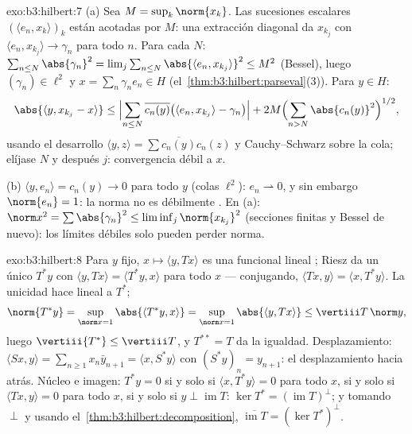 \begin{solution}{exo:b3:hilbert:7}
(a) Sea $M = \sup_k\norm{x_k}$. Las sucesiones escalares
$(\langle e_n, x_k\rangle)_k$ están acotadas por $M$: una extracción
diagonal da $x_{k_j}$ con $\langle e_n, x_{k_j}\rangle
\to \gamma_n$ para todo $n$. Para cada $N$: $\sum_{n\leq
N}\abs{\gamma_n}^2 = \lim_j\sum_{n\leq N}\abs{\langle e_n,
x_{k_j}\rangle}^2 \leq M^2$ (Bessel), luego $(\gamma_n) \in
\ell^2$ y $x = \sum_n\gamma_ne_n \in H$
(el~\cref{thm:b3:hilbert:parseval}(3)). Para $y \in H$:
\[
\abs{\langle y, x_{k_j} - x\rangle}
\leq \Bigl|\sum_{n\leq N}\overline{c_n(y)}\bigl(\langle e_n,
x_{k_j}\rangle - \gamma_n\bigr)\Bigr|
+ 2M\Bigl(\sum_{n>N}\abs{c_n(y)}^2\Bigr)^{1/2},
\]
usando el desarrollo $\langle y, z\rangle =
\sum\overline{c_n(y)}c_n(z)$ y Cauchy--Schwarz sobre la cola; elíjase
$N$ y después $j$: convergencia débil a $x$.

(b) $\langle y, e_n\rangle = c_n(y) \to 0$ para todo $y$ (colas
$\ell^2$): $e_n \rightharpoonup 0$, y sin embargo $\norm{e_n} =
1$: la norma no es débilmente
. En (a): $\norm x^2 =
\sum\abs{\gamma_n}^2 \leq \liminf_j\norm{x_{k_j}}^2$ (secciones finitas
y Bessel de nuevo): los límites débiles solo pueden perder norma.
\end{solution}

\begin{solution}{exo:b3:hilbert:8}
Para $y$ fijo, $x \mapsto \langle y, Tx\rangle$ es una funcional lineal
; Riesz da un único $T^*y$
con $\langle y, Tx\rangle = \langle T^*y, x\rangle$ para todo $x$ ---
conjugando, $\langle Tx, y\rangle = \langle x,
T^*y\rangle$. La unicidad hace lineal a $T^*$;
\[
\norm{T^*y} = \sup_{\norm x = 1}\abs{\langle T^*y, x\rangle}
= \sup_{\norm x=1}\abs{\langle y, Tx\rangle}
\leq \vertiii T\,\norm y,
\]
luego $\vertiii{T^*} \leq \vertiii T$, y $T^{**} = T$ da la igualdad.
Desplazamiento: $\langle Sx, y\rangle = \sum_{n\geq1}
x_n\bar y_{n+1} = \langle x, S^*y\rangle$ con $(S^*y)_n =
y_{n+1}$: el desplazamiento hacia atrás. Núcleo e imagen: $T^*y = 0$ si
y solo si $\langle x, T^*y\rangle = 0$ para todo $x$, si y solo si
$\langle Tx,
y\rangle = 0$ para todo $x$, si y solo si $y \perp \operatorname{im}T$:
$\ker T^* = (\operatorname{im}T)^\perp$; y tomando $\perp$ y usando
el~\cref{thm:b3:hilbert:decomposition},
$\overline{\operatorname{im}T} = (\ker T^*)^\perp$.
\end{solution}

